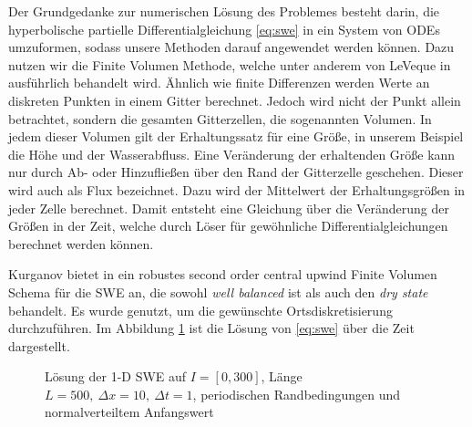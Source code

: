 Der Grundgedanke zur numerischen Lösung des Problemes besteht darin, die hyperbolische partielle Differentialgleichung \eqref{eq:swe} in ein System von ODEs umzuformen, sodass unsere Methoden darauf angewendet werden können.
Dazu nutzen wir die Finite Volumen Methode, welche unter anderem von LeVeque in \cite[Abschnitt 4.]{leveque2002finite} ausführlich behandelt wird. Ähnlich wie finite Differenzen werden Werte an diskreten Punkten in einem Gitter berechnet. Jedoch wird nicht der Punkt allein betrachtet, sondern die gesamten Gitterzellen, die sogenannten Volumen. In jedem dieser Volumen gilt der Erhaltungssatz für eine Größe, in unserem Beispiel die Höhe und der Wasserabfluss. Eine Veränderung der erhaltenden Größe kann nur durch Ab- oder Hinzufließen über den Rand der Gitterzelle geschehen. Dieser wird auch als Flux bezeichnet. Dazu wird der Mittelwert der Erhaltungsgrößen in jeder Zelle berechnet. Damit entsteht eine Gleichung über die Veränderung der Größen in der Zeit, welche durch Löser für gewöhnliche Differentialgleichungen berechnet werden können.

Kurganov bietet in \cite{kurganov2007second} ein robustes second order central upwind Finite Volumen Schema für die SWE an, die sowohl \textit{well balanced} ist als auch den \textit{dry state} behandelt. Es wurde genutzt, um die gewünschte Ortsdiskretisierung durchzuführen. Im Abbildung \ref{fig:sweSolution} ist die Lösung von \eqref{eq:swe} über die Zeit dargestellt.

\begin{figure}
 \centering
 
 \caption{Lösung der 1-D SWE auf $I=[0,300]$, Länge $L=500,~\Delta x=10,~\Delta t=1$, periodischen Randbedingungen und normalverteiltem Anfangswert}
 \label{fig:sweSolution}
\end{figure}

